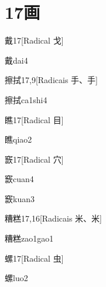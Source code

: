 
\section*{17画}

\begin{entry}{戴}{17}[Radical ⼽]
  \begin{phonetics}{戴}{dai4}
  \end{phonetics}
\end{entry}

\begin{entry}{擦拭}{17,9}[Radicais ⼿、⼿]
  \begin{phonetics}{擦拭}{ca1shi4}
  \end{phonetics}
\end{entry}

\begin{entry}{瞧}{17}[Radical ⽬]
  \begin{phonetics}{瞧}{qiao2}
  \end{phonetics}
\end{entry}

\begin{entry}{窾}{17}[Radical ⽳]
  \begin{phonetics}{窾}{cuan4}
  \end{phonetics}
  \begin{phonetics}{窾}{kuan3}
  \end{phonetics}
\end{entry}

\begin{entry}{糟糕}{17,16}[Radicais ⽶、⽶]
  \begin{phonetics}{糟糕}{zao1gao1}
  \end{phonetics}
\end{entry}

\begin{entry}{螺}{17}[Radical ⾍]
  \begin{phonetics}{螺}{luo2}
  \end{phonetics}
\end{entry}

